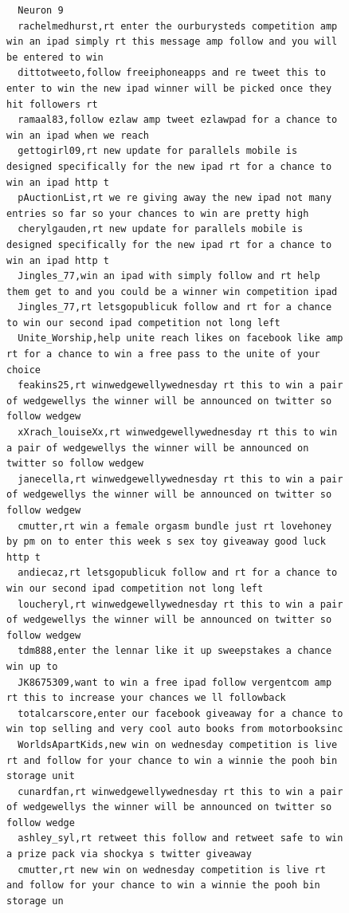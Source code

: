 \begin{figure}[htpb]
\begin{verbatim}
  Neuron 9
  rachelmedhurst,rt enter the ourburysteds competition amp win an ipad simply rt this message amp follow and you will be entered to win
  dittotweeto,follow freeiphoneapps and re tweet this to enter to win the new ipad winner will be picked once they hit followers rt
  ramaal83,follow ezlaw amp tweet ezlawpad for a chance to win an ipad when we reach
  gettogirl09,rt new update for parallels mobile is designed specifically for the new ipad rt for a chance to win an ipad http t
  pAuctionList,rt we re giving away the new ipad not many entries so far so your chances to win are pretty high
  cherylgauden,rt new update for parallels mobile is designed specifically for the new ipad rt for a chance to win an ipad http t
  Jingles_77,win an ipad with simply follow and rt help them get to and you could be a winner win competition ipad
  Jingles_77,rt letsgopublicuk follow and rt for a chance to win our second ipad competition not long left
  Unite_Worship,help unite reach likes on facebook like amp rt for a chance to win a free pass to the unite of your choice
  feakins25,rt winwedgewellywednesday rt this to win a pair of wedgewellys the winner will be announced on twitter so follow wedgew
  xXrach_louiseXx,rt winwedgewellywednesday rt this to win a pair of wedgewellys the winner will be announced on twitter so follow wedgew
  janecella,rt winwedgewellywednesday rt this to win a pair of wedgewellys the winner will be announced on twitter so follow wedgew
  cmutter,rt win a female orgasm bundle just rt lovehoney by pm on to enter this week s sex toy giveaway good luck http t
  andiecaz,rt letsgopublicuk follow and rt for a chance to win our second ipad competition not long left
  loucheryl,rt winwedgewellywednesday rt this to win a pair of wedgewellys the winner will be announced on twitter so follow wedgew
  tdm888,enter the lennar like it up sweepstakes a chance win up to
  JK8675309,want to win a free ipad follow vergentcom amp rt this to increase your chances we ll followback
  totalcarscore,enter our facebook giveaway for a chance to win top selling and very cool auto books from motorbooksinc
  WorldsApartKids,new win on wednesday competition is live rt and follow for your chance to win a winnie the pooh bin storage unit
  cunardfan,rt winwedgewellywednesday rt this to win a pair of wedgewellys the winner will be announced on twitter so follow wedge
  ashley_syl,rt retweet this follow and retweet safe to win a prize pack via shockya s twitter giveaway
  cmutter,rt new win on wednesday competition is live rt and follow for your chance to win a winnie the pooh bin storage un

\end{verbatim}
\end{figure}
